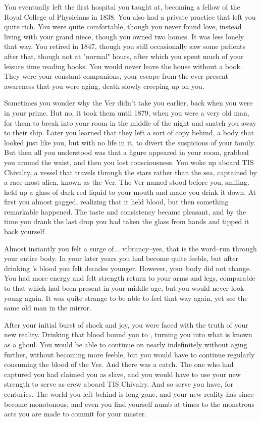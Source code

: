 \documentclass[char]{guildcamp4}
\begin{document}
You eventually left the first hospital you taught at, becoming a fellow of the Royal College of Physicians in 1838. You also had a private practice that left you quite rich. You were quite comfortable, though you never found love, instead living with your grand niece, though you owned two homes. It was less lonely that way. You retired in 1847, though you still occasionally saw some patients after that, though not at "normal" hours, after which you spent much of your leisure time reading books. You would never leave the house without a book. They were your constant companions, your escape from the ever-present awareness that you were aging, death slowly creeping up on you.

Sometimes you wonder why the Ver didn't take you earlier, back when you were in your prime. But no, it took them until 1879, when you were a very old man, for them to break into your room in the middle of the night and snatch you away to their ship. Later you learned that they left a sort of copy behind, a body that looked just like you, but with no life in it, to divert the suspicions of your family. But then all you understood was that a figure appeared in your room, grabbed you around the waist, and then you lost consciousness. You woke up aboard TIS Chivalry, a vessel that travels through the stars rather than the sea, captained by a race most alien, known as the Ver. The Ver named \cVone{} stood before you, smiling. \cVone{\They} held up a glass of dark red liquid to your mouth and made you drink it down. At first you almost gagged, realizing that it held blood, but then something remarkable happened. The taste and consistency became pleasant, and by the time you drank the last drop you had taken the glass from \cVone{\their} hands and tipped it back yourself.

Almost instantly you felt a surge of... vibrancy--yes, that is the word--run through your entire body. In your later years you had become quite feeble, but after drinking \cVone{}'s blood you felt decades younger. However, your body did not change. You had more energy and felt strength return to your arms and legs, comparable to that which had been present in your middle age, but you would never look young again. It was quite strange to be able to feel that way again, yet see the same old man in the mirror.

After your initial burst of shock and joy, you were faced with the truth of your new reality. Drinking that blood bound you to \cVone{}, turning you into what is known as a ghoul. You would be able to continue on nearly indefinitely without aging further, without becoming more feeble, but you would have to continue regularly consuming the blood of the Ver. And there was a catch. The one who had captured you had claimed you as \cVone{\their} slave, and you would have to use your new strength to serve as crew aboard TIS Chivalry. And so serve you have, for centuries. The world you left behind is long gone, and your new reality has since become monotonous, and even you find yourself numb at times to the monstrous acts you are made to commit for your master.
\end{document}
